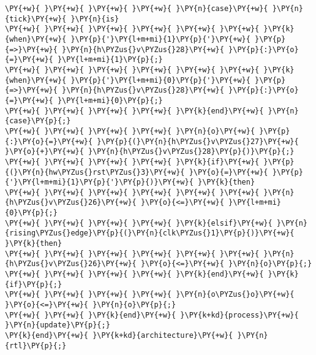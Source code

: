 \begin{Verbatim}[commandchars=\\\{\}]
\PY{+w}{ }\PY{+w}{ }\PY{+w}{ }\PY{+w}{ }\PY{n}{case}\PY{+w}{ }\PY{n}{tick}\PY{+w}{ }\PY{n}{is}
\PY{+w}{ }\PY{+w}{ }\PY{+w}{ }\PY{+w}{ }\PY{+w}{ }\PY{+w}{ }\PY{k}{when}\PY{+w}{ }\PY{p}{'}\PY{l+m+mi}{1}\PY{p}{'}\PY{+w}{ }\PY{p}{=>}\PY{+w}{ }\PY{n}{h\PYZus{}v\PYZus{}28}\PY{+w}{ }\PY{p}{:}\PY{o}{=}\PY{+w}{ }\PY{l+m+mi}{1}\PY{p}{;}
\PY{+w}{ }\PY{+w}{ }\PY{+w}{ }\PY{+w}{ }\PY{+w}{ }\PY{+w}{ }\PY{k}{when}\PY{+w}{ }\PY{p}{'}\PY{l+m+mi}{0}\PY{p}{'}\PY{+w}{ }\PY{p}{=>}\PY{+w}{ }\PY{n}{h\PYZus{}v\PYZus{}28}\PY{+w}{ }\PY{p}{:}\PY{o}{=}\PY{+w}{ }\PY{l+m+mi}{0}\PY{p}{;}
\PY{+w}{ }\PY{+w}{ }\PY{+w}{ }\PY{+w}{ }\PY{k}{end}\PY{+w}{ }\PY{n}{case}\PY{p}{;}
\PY{+w}{ }\PY{+w}{ }\PY{+w}{ }\PY{+w}{ }\PY{n}{o}\PY{+w}{ }\PY{p}{:}\PY{o}{=}\PY{+w}{ }\PY{p}{(}\PY{n}{h\PYZus{}v\PYZus{}27}\PY{+w}{ }\PY{o}{+}\PY{+w}{ }\PY{n}{h\PYZus{}v\PYZus{}28}\PY{p}{)}\PY{p}{;}
\PY{+w}{ }\PY{+w}{ }\PY{+w}{ }\PY{+w}{ }\PY{k}{if}\PY{+w}{ }\PY{p}{(}\PY{n}{hw\PYZus{}rst\PYZus{}3}\PY{+w}{ }\PY{o}{=}\PY{+w}{ }\PY{p}{'}\PY{l+m+mi}{1}\PY{p}{'}\PY{p}{)}\PY{+w}{ }\PY{k}{then}
\PY{+w}{ }\PY{+w}{ }\PY{+w}{ }\PY{+w}{ }\PY{+w}{ }\PY{+w}{ }\PY{n}{h\PYZus{}v\PYZus{}26}\PY{+w}{ }\PY{o}{<=}\PY{+w}{ }\PY{l+m+mi}{0}\PY{p}{;}
\PY{+w}{ }\PY{+w}{ }\PY{+w}{ }\PY{+w}{ }\PY{k}{elsif}\PY{+w}{ }\PY{n}{rising\PYZus{}edge}\PY{p}{(}\PY{n}{clk\PYZus{}1}\PY{p}{)}\PY{+w}{ }\PY{k}{then}
\PY{+w}{ }\PY{+w}{ }\PY{+w}{ }\PY{+w}{ }\PY{+w}{ }\PY{+w}{ }\PY{n}{h\PYZus{}v\PYZus{}26}\PY{+w}{ }\PY{o}{<=}\PY{+w}{ }\PY{n}{o}\PY{p}{;}
\PY{+w}{ }\PY{+w}{ }\PY{+w}{ }\PY{+w}{ }\PY{k}{end}\PY{+w}{ }\PY{k}{if}\PY{p}{;}
\PY{+w}{ }\PY{+w}{ }\PY{+w}{ }\PY{+w}{ }\PY{n}{o\PYZus{}o}\PY{+w}{ }\PY{o}{<=}\PY{+w}{ }\PY{n}{o}\PY{p}{;}
\PY{+w}{ }\PY{+w}{ }\PY{k}{end}\PY{+w}{ }\PY{k+kd}{process}\PY{+w}{ }\PY{n}{update}\PY{p}{;}
\PY{k}{end}\PY{+w}{ }\PY{k+kd}{architecture}\PY{+w}{ }\PY{n}{rtl}\PY{p}{;}
\end{Verbatim}
